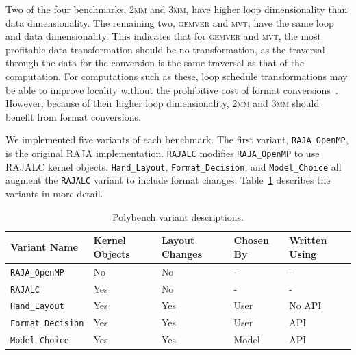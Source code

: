 \documentclass[sigconf,review=true]{acmart}
\begin{document}
Two of the four benchmarks, \textsc{2mm} and \textsc{3mm}, have higher loop dimensionality than data dimensionality. 
The remaining two, \textsc{gemver} and \textsc{mvt}, have the same loop and data dimensionality. 
This indicates that for \textsc{gemver} and \textsc{mvt}, the most profitable data transformation should be no transformation, as the traversal through the data for the conversion is the same traversal as that of the computation.
For computations such as these, loop schedule transformations may be able to improve locality without the prohibitive cost of format conversions~\cite{kandemir1998improving}.
However, because of their higher loop dimensionality, \textsc{2mm} and \textsc{3mm} should benefit from format conversions.

We implemented five variants of each benchmark.
The first variant, \verb.RAJA_OpenMP., is the original RAJA implementation.
\verb.RAJALC. modifies \verb.RAJA_OpenMP. to use RAJALC kernel objects.
\verb.Hand_Layout., \verb.Format_Decision., and \verb.Model_Choice. all augment the \verb.RAJALC. variant to include format changes.
Table~\ref{VariantDescription} describes the variants in more detail.

\begin{table}
	\centering
	\begin{tabular}{ p{2.4cm} | p{1.1cm} | p{1.1cm} | p{1cm} | p{1cm}}
		 \raggedright Variant \linebreak Name & \raggedright Kernel Objects & \raggedright Layout Changes & \raggedright Chosen By &  Written Using \tabularnewline
		\hline
		\verb.RAJA_OpenMP. & No & No & - & - \\
		\verb.RAJALC. & Yes & No & - & - \\
		\verb.Hand_Layout. & Yes & Yes & User & No API \\
		\verb.Format_Decision. & Yes & Yes & User & API \\
		\verb.Model_Choice. & Yes & Yes & Model & API
	\end{tabular}
	\caption{Polybench variant descriptions.}
	\label{VariantDescription}
\end{table}
\end{document}

